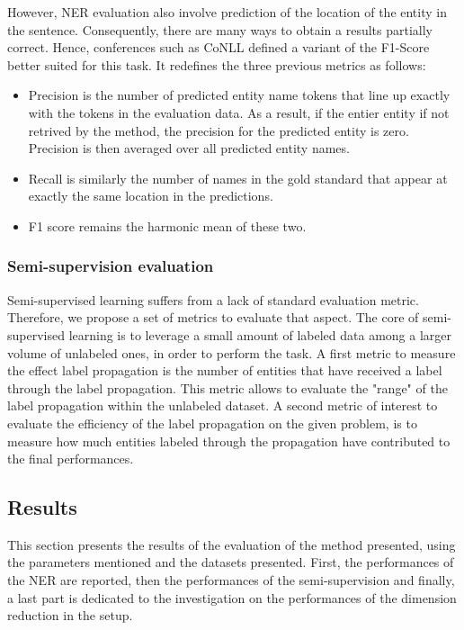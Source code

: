 However, NER evaluation also involve prediction of the location of the entity in the sentence.
Consequently, there are many ways to obtain a results partially correct.
Hence, conferences such as CoNLL defined a variant of the F1-Score better suited for this task.
It redefines the three previous metrics as follows:
\begin{itemize}
    \item Precision is the number of predicted entity name tokens that line up exactly with the tokens in the evaluation data.
          As a result, if the entier entity if not retrived by the method, the precision for the predicted entity is zero.
          Precision is then averaged over all predicted entity names.
    \item Recall is similarly the number of names in the gold standard that appear at exactly the same location in the predictions.
    \item F1 score remains the harmonic mean of these two.
\end{itemize}

\subsubsection{Semi-supervision evaluation}
Semi-supervised learning suffers from a lack of standard evaluation metric.
Therefore, we propose a set of metrics to evaluate that aspect.
The core of semi-supervised learning is to leverage a small amount of labeled data among
a larger volume of unlabeled ones, in order to perform the task.
A first metric to measure the effect label propagation is the number of entities that have received a label
through the label propagation.
This metric allows to evaluate the "range" of the label propagation within the unlabeled dataset.
A second metric of interest to evaluate the efficiency of the label propagation on the given
problem, is to measure how much entities labeled through the propagation have contributed
to the final performances.

\subsection{Results}
This section presents the results of the evaluation of the method presented, using the
parameters mentioned and the datasets presented.
First, the performances of the NER are reported, then the performances of the semi-supervision
and finally, a last part is dedicated to the investigation on the performances of the
dimension reduction in the setup.

